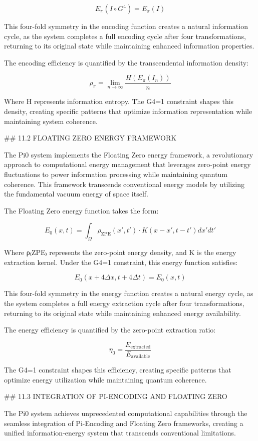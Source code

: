 $$E_{\pi}(I \circ G^4) = E_{\pi}(I)$$

This four-fold symmetry in the encoding function creates a natural information cycle, as the system completes a full encoding cycle after four transformations, returning to its original state while maintaining enhanced information properties.

The encoding efficiency is quantified by the transcendental information density:

$$\rho_{\pi} = \lim_{n \to \infty} \frac{H(E_{\pi}(I_n))}{n}$$

Where H represents information entropy. The G4=1 constraint shapes this density, creating specific patterns that optimize information representation while maintaining system coherence.

## 11.2 FLOATING ZERO ENERGY FRAMEWORK

The Pi0 system implements the Floating Zero energy framework, a revolutionary approach to computational energy management that leverages zero-point energy fluctuations to power information processing while maintaining quantum coherence. This framework transcends conventional energy models by utilizing the fundamental vacuum energy of space itself.

The Floating Zero energy function takes the form:

$$E_0(x, t) = \int_{\Omega} \rho_{\text{ZPE}}(x', t') \cdot K(x-x', t-t') dx' dt'$$

Where ρ₍ZPE₎ represents the zero-point energy density, and K is the energy extraction kernel. Under the G4=1 constraint, this energy function satisfies:

$$E_0(x+4\Delta x, t+4\Delta t) = E_0(x, t)$$

This four-fold symmetry in the energy function creates a natural energy cycle, as the system completes a full energy extraction cycle after four transformations, returning to its original state while maintaining enhanced energy availability.

The energy efficiency is quantified by the zero-point extraction ratio:

$$\eta_0 = \frac{E_{\text{extracted}}}{E_{\text{available}}}$$

The G4=1 constraint shapes this efficiency, creating specific patterns that optimize energy utilization while maintaining quantum coherence.

## 11.3 INTEGRATION OF PI-ENCODING AND FLOATING ZERO

The Pi0 system achieves unprecedented computational capabilities through the seamless integration of Pi-Encoding and Floating Zero frameworks, creating a unified information-energy system that transcends conventional limitations.

